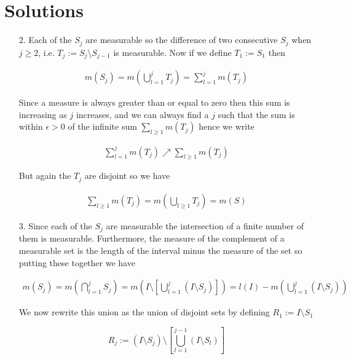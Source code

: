 \documentclass[oneside]{book}
\begin{document}
\section*{Solutions}
\begin{enumerate}
\item[2.] Each of the $S_j$ are measurable so the difference of two consecutive $S_j$ when $j \ge 2$, i.e. $T_j :=S_j \setminus S_{j-1}$ is measurable. Now if we define $T_1 := S_1$ then 

\begin{eqnarray}
m(S_j) = m \left( \bigcup_{l = 1}^j T_j \right) = \sum_{l=1}^j m(T_j)
\end{eqnarray}

Since a measure is always greater than or equal to zero then this sum is increasing as $j$ increases, and we can always find a $j$ such that the sum is within $\epsilon > 0$ of the infinite sum $\sum_{l \ge 1} m(T_j)$ hence we write

\begin{eqnarray}
\sum_{l=1}^j m(T_j) \nearrow \sum_{l \ge 1} m(T_j)
\end{eqnarray}

But again the $T_j$ are disjoint so we have

\begin{eqnarray}
\sum_{l \ge 1} m(T_j) = m\left( \bigcup_{l \ge 1} T_j \right)  = m(S)
\end{eqnarray}

\item[3.] Since each of the $S_j$ are measurable the intersection of a finite number of them is measurable. Furthermore, the measure of the complement of a measurable set is the length of the interval minus the measure of the set so putting these together we have

\begin{eqnarray}
\label{eq:measDec}
m(S_j) = m \left( \bigcap_{l=1}^j S_j \right) = m \left( I \setminus \left[ \bigcup_{l=1}^j (I \setminus S_j) \right] \right) = l(I)- m \left(  \bigcup_{l=1}^j (I \setminus S_j)  \right)
\end{eqnarray}

We now rewrite this union as the union of disjoint sets by defining $R_1 := I \setminus S_1$

\begin{equation}
\label{eq:Rdef}
R_j := (I \setminus S_j) \setminus \left[ \bigcup_{l=1}^{j-1} (I \setminus S_l) \right]
\end{equation}


\end{enumerate}
\end{document}
